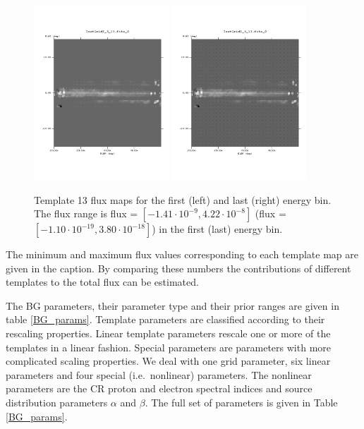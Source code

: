 \documentclass{article}
\begin{document}
\begin{figure}
\centering
\includegraphics[trim = 50 100 70 100, clip = true, width=0.45\textwidth]{figs/Template_maps/Template13_Ebin01}
\includegraphics[trim = 50 100 70 100, clip = true, width=0.45\textwidth]{figs/Template_maps/Template13_Ebin71}
\caption{Template 13 flux maps for the first (left) and last (right) energy bin. The flux range is flux = $[-1.41 \cdot 10^{-9}, 4.22 \cdot 10^{-8}]$ (flux = $[-1.10 \cdot 10^{-19}, 3.80 \cdot 10^{-18}]$) in the first (last) energy bin.}
\label{TM13}
\end{figure}
The minimum and maximum flux values corresponding to each template map are given in the caption. By comparing these numbers the contributions of different templates to the total flux can be estimated.


The BG parameters, their parameter type and their prior ranges are given in table \ref{BG_params}. Template parameters are classified according to their rescaling properties. Linear template parameters rescale one or more of the templates in a linear fashion. Special parameters are parameters with more complicated scaling properties. We deal with one grid parameter, six linear parameters and four special (i.e.\ nonlinear) parameters.  The nonlinear parameters are the CR proton and electron spectral indices and source distribution parameters $\alpha$ and $\beta$.  The full set of parameters is given in Table \ref{BG_params}.
\end{document}
